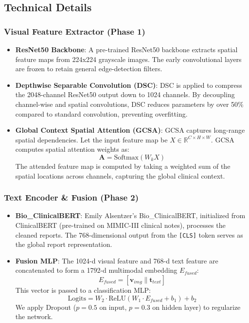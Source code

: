 \documentclass[11pt,a4paper]{article}
\begin{document}
\subsection{Technical Details}

\subsubsection{Visual Feature Extractor (Phase 1)}
\begin{itemize}
    \item \textbf{ResNet50 Backbone}: A pre-trained ResNet50 backbone extracts spatial feature maps from 224x224 grayscale images. The early convolutional layers are frozen to retain general edge-detection filters.
    \item \textbf{Depthwise Separable Convolution (DSC)}: DSC is applied to compress the 2048-channel ResNet50 output down to 1024 channels. By decoupling channel-wise and spatial convolutions, DSC reduces parameters by over 50\% compared to standard convolution, preventing overfitting.
    \item \textbf{Global Context Spatial Attention (GCSA)}: GCSA captures long-range spatial dependencies. Let the input feature map be $X \in \mathbb{R}^{C \times H \times W}$. GCSA computes spatial attention weights as:
    \begin{equation}
        \mathbf{A} = \text{Softmax}\left(W_k X\right)
    \end{equation}
    The attended feature map is computed by taking a weighted sum of the spatial locations across channels, capturing the global clinical context.
\end{itemize}

\subsubsection{Text Encoder \& Fusion (Phase 2)}
\begin{itemize}
    \item \textbf{Bio\_ClinicalBERT}: Emily Alsentzer's Bio\_ClinicalBERT, initialized from ClinicalBERT (pre-trained on MIMIC-III clinical notes), processes the cleaned reports. The 768-dimensional output from the \texttt{[CLS]} token serves as the global report representation.
    \item \textbf{Fusion MLP}: The 1024-d visual feature and 768-d text feature are concatenated to form a 1792-d multimodal embedding $E_{fused}$:
    \begin{equation}
        E_{fused} = [\mathbf{v}_{img} \parallel \mathbf{t}_{text}]
    \end{equation}
    This vector is passed to a classification MLP:
    \begin{equation}
        \text{Logits} = W_2 \cdot \text{ReLU}\left(W_1 \cdot E_{fused} + b_1\right) + b_2
    \end{equation}
    We apply Dropout ($p=0.5$ on input, $p=0.3$ on hidden layer) to regularize the network.
\end{itemize}
\end{document}
